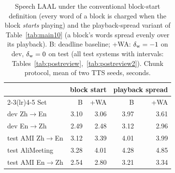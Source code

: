 \begin{table}[t]
\centering\small
\setlength{\tabcolsep}{4pt}
\begin{tabular}{lrrrr}
\toprule
 & \multicolumn{2}{c}{block start} & \multicolumn{2}{c}{playback spread} \\
\cmidrule(lr){2-3}\cmidrule(lr){4-5}
Set & B & \sys{}+WA & B & \sys{}+WA \\
\midrule
dev Zh$\rightarrow$En & 3.10 & 3.06 & 3.97 & 3.61 \\
dev En$\rightarrow$Zh & 2.49 & 2.48 & 3.12 & 2.96 \\
test AMI Zh$\rightarrow$En & 3.12 & 3.39 & 4.01 & 3.99 \\
test AliMeeting & 3.28 & 4.01 & 4.28 & 4.85 \\
test AMI En$\rightarrow$Zh & 2.54 & 2.80 & 3.21 & 3.34 \\
\bottomrule
\end{tabular}
\caption{Speech LAAL under the conventional block-start definition (every word of a block is charged when the block \emph{starts} playing) and the playback-spread variant of Table~\ref{tab:main10} (a block's words spread evenly over its playback). B: deadline baseline; \sys{}+WA: $\delta_{\mathrm{w}}=-1$ on dev, $\delta_{\mathrm{w}}=0$ on test (all test systems with intervals: Tables~\ref{tab:postreview},~\ref{tab:postreview2}). Chunk protocol, mean of two TTS seeds, seconds.}
\label{tab:m2laal10}
\end{table}
